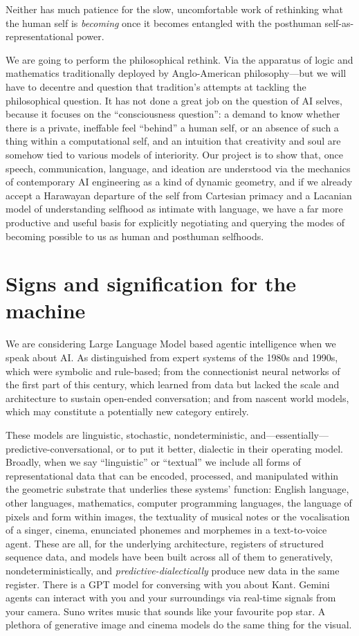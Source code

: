 Neither has much patience for the slow, uncomfortable work of rethinking what the human self is \textit{becoming} once it becomes entangled with the posthuman self-as-representational power.

We are going to perform the philosophical rethink. Via the apparatus of logic and mathematics traditionally deployed by Anglo-American philosophy---but we will have to decentre and question that tradition's attempts at tackling the philosophical question. It has not done a great job on the question of AI selves, because it focuses on the ``consciousness question'': a demand to know whether there is a private, ineffable feel ``behind'' a human self, or an absence of such a thing within a computational self, and an intuition that creativity and soul are somehow tied to various models of interiority. Our project is to show that, once speech, communication, language, and ideation are understood via the mechanics of contemporary AI engineering as a kind of dynamic geometry, and if we already accept a Harawayan departure of the self from Cartesian primacy and a Lacanian model of understanding selfhood as intimate with language, we have a far more productive and useful basis for explicitly negotiating and querying the modes of becoming possible to us as human and posthuman selfhoods.


\section{Signs and signification for the machine}

We are considering Large Language Model based agentic intelligence when we speak about AI. As distinguished from expert systems of the 1980s and 1990s, which were symbolic and rule-based; from the connectionist neural networks of the first part of this century, which learned from data but lacked the scale and architecture to sustain open-ended conversation; and from nascent world models, which may constitute a potentially new category entirely.

These models are linguistic, stochastic, nondeterministic, and---essentially---predictive-conversational, or to put it better, dialectic in their operating model. Broadly, when we say ``linguistic'' or ``textual'' we include all forms of representational data that can be encoded, processed, and manipulated within the geometric substrate that underlies these systems' function: English language, other languages, mathematics, computer programming languages, the language of pixels and form within images, the textuality of musical notes or the vocalisation of a singer, cinema, enunciated phonemes and morphemes in a text-to-voice agent. These are all, for the underlying architecture, registers of structured sequence data, and models have been built across all of them to generatively, nondeterministically, and \textit{predictive-dialectically} produce new data in the same register. There is a GPT model for conversing with you about Kant. Gemini agents can interact with you and your surroundings via real-time signals from your camera. Suno writes music that sounds like your favourite pop star. A plethora of generative image and cinema models do the same thing for the visual.

